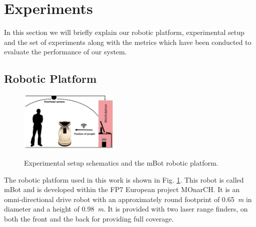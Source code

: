 \section{Experiments}
\label{exp}
In this section we will briefly explain our robotic platform, experimental setup and the set of experiments along with the metrics which have been conducted to evaluate the performance of our system.

\subsection{Robotic Platform}
\label{sec:robot}

\begin{figure}
\centering
\includegraphics[width=0.42\textwidth]{pictures/setup.jpg}\label{fig:robot}%
\caption{Experimental setup schematics and the mBot robotic platform.}
\label{fig:setup}
\end{figure}





The robotic platform used in this work is shown in Fig. \ref{fig:setup}. This robot is called mBot \cite{Messias2014robotic} and is developed within the FP7 European project MOnarCH.
It is an omni-directional drive robot with an approximately round footprint of 0.65~\textit{m} in diameter and a height of 0.98~\textit{m}.
It is provided with two laser range finders, on both the front and the back for providing full coverage.

